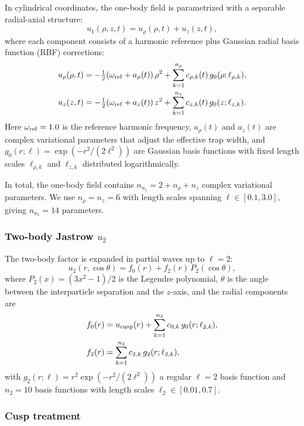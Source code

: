 \documentclass[twocolumn,superscriptaddress,aps,pra,longbibliography]{revtex4-2}
\begin{document}
In cylindrical coordinates, the one-body field is parametrized with a
separable radial-axial structure:
\begin{equation}
u_1(\rho, z, t) = u_\rho(\rho,t) + u_z(z,t),
\label{eq:u1_separable}
\end{equation}
where each component consists of a harmonic reference plus Gaussian
radial basis function (RBF) corrections:
\begin{align}
u_\rho(\rho,t) &= -\tfrac{1}{2}(\omega_{\rm ref} + a_\rho(t))\,\rho^2
+ \sum_{k=1}^{n_\rho} c_{\rho,k}(t)\, g_0(\rho;\ell_{\rho,k}),
\label{eq:u1_rho}
\\
u_z(z,t) &= -\tfrac{1}{2}(\omega_{\rm ref} + a_z(t))\,z^2
+ \sum_{k=1}^{n_z} c_{z,k}(t)\, g_0(z;\ell_{z,k}).
\label{eq:u1_z}
\end{align}
Here $\omega_{\rm ref}=1.0$ is the reference harmonic frequency,
$a_\rho(t)$ and $a_z(t)$ are complex variational parameters that
adjust the effective trap width, and
$g_0(r;\ell) = \exp(-r^2/(2\ell^2))$ are Gaussian basis functions with
fixed length scales $\ell_{\rho,k}$ and $\ell_{z,k}$ distributed
logarithmically.

In total, the one-body field contains $n_{u_1} = 2 + n_\rho + n_z$
complex variational parameters.  We use $n_\rho = n_z = 6$ with
length scales spanning $\ell \in [0.1, 3.0]$, giving
$n_{u_1} = 14$ parameters.

\subsubsection{Two-body Jastrow $u_2$}

The two-body factor is expanded in partial waves up to $\ell=2$:
\begin{equation}
u_2(r,\cos\theta) = f_0(r) + f_2(r)\,P_2(\cos\theta),
\label{eq:u2_partial}
\end{equation}
where $P_2(x) = (3x^2-1)/2$ is the Legendre polynomial, $\theta$ is the
angle between the interparticle separation and the $z$-axis, and the
radial components are
\begin{align}
f_0(r) &= u_{\rm cusp}(r)
+ \sum_{k=1}^{n_2} c_{0,k}\, g_0(r;\ell_{2,k}),
\label{eq:f0}
\\
f_2(r) &= \sum_{k=1}^{n_2} c_{2,k}\, g_2(r;\ell_{2,k}),
\label{eq:f2}
\end{align}
with $g_2(r;\ell) = r^2\exp(-r^2/(2\ell^2))$ a regular $\ell=2$ basis
function and $n_2=10$ basis functions with length scales
$\ell_2 \in [0.01, 0.7]$.

\subsubsection{Cusp treatment}
\label{sec:cusp}
\end{document}
